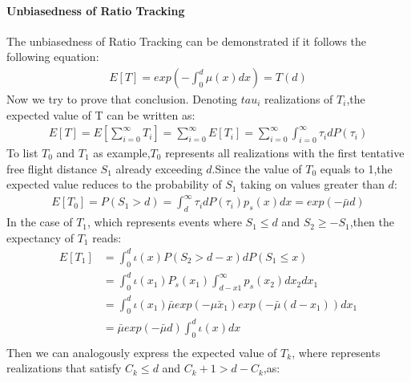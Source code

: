 \documentclass[acmtog]{acmart}
\begin{document}
\paragraph {\textbf{Unbiasedness of Ratio Tracking}}
The unbiasedness of Ratio Tracking can be demonstrated if it follows the following equation:
\begin{equation}
	\begin{aligned}
		E[T] = exp(-\int_{0}^{d}\mu(x)dx) = T(d)
	\end{aligned}
\end{equation}
Now we try to prove that conclusion.
Denoting $tau_i$ realizations of $T_i$,the expected value of T can be written as:
\begin{equation}
	\begin{aligned}
		E[T] = E[\sum_{i=0}^{\infty}T_i]=\sum_{i=0}^{\infty}E[T_i]=\sum_{i=0}^{\infty}\int_{i=0}^{\infty}\tau_i dP(\tau_i)
	\end{aligned}
\end{equation}
To list $T_0$ and $T_1$ as example,$T_0$ represents all realizations with the first tentative free flight distance $S_1$ already exceeding $d$.Since the value of $T_0$ equals to 1,the expected value reduces to the probability of $S_1$ taking on values greater than $d$:
\begin{equation}
	\begin{aligned}
	E[T_0] = P(S_1> d) = \int_{d}^{\infty}\tau_i dP(\tau_i)p_s(x)dx = exp(-\bar{\mu}d)
	\end{aligned}
\end{equation}
In the case of $T_1$, which represents events where $S_1 \leq d$ and $S_2 \geq -S_1$,then the expectancy of $T_1$ reads:
\begin{equation}
	\begin{aligned}
		E[T_1] &= \int_{0}^{d}\iota(x) P(S_2>d-x)dP(S_1\leq x)\\
			   &= \int_{0}^{d}\iota(x_1) P_s(x_1)\int_{d-x1}^{\infty}p_s(x_2)dx_2dx_1\\
			   &= \int_{0}^{d}\iota(x_1) \bar{\mu} exp(-\bar{\mu x_1})exp(-\bar \mu(d-x_1))dx_1\\
		   	   &=\bar{\mu}exp(-\bar{\mu}d)\int_{0}^{d}\iota(x)dx\\
	\end{aligned}
\end{equation}
Then we can analogously express the expected value of $T_k$, where represents realizations that satisfy $C_k \leq d$ and $C_k+1 >d-C_k$,as:
\end{document}
